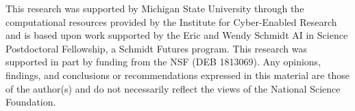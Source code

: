 \begin{acks}

This research was supported by Michigan State University through the computational resources provided by the Institute for Cyber-Enabled Research and is based upon work supported by the Eric and Wendy Schmidt AI in Science Postdoctoral Fellowship, a Schmidt Futures program.
This research was supported in part by funding from the NSF (DEB 1813069).
Any opinions, findings, and conclusions or recommendations expressed in this material are those of the author(s) and do not necessarily reflect the views of the National Science Foundation.

\end{acks}
